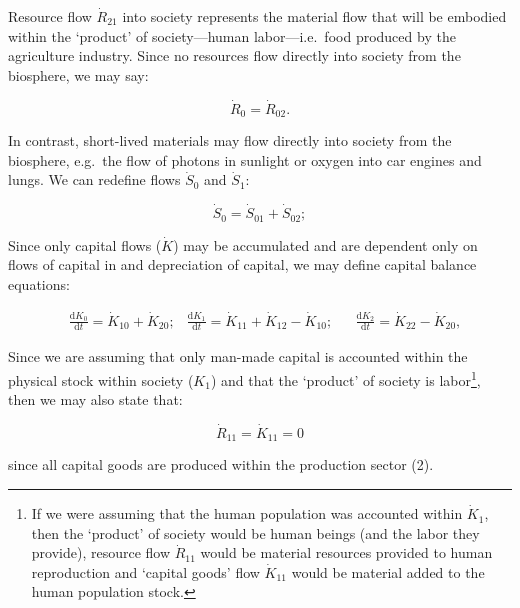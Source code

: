 Resource flow $\dot{R}_{21}$ into society represents the material flow that will be embodied
within the `product' of society---human labor---i.e.~food produced by the agriculture
industry. %
Since no resources flow directly into society from the biosphere, we may say:

\begin{equation}\label{eq:B_R0}
	\dot{R}_{0} = \dot{R}_{02}.
\end{equation}

In contrast, short-lived materials may flow directly into society from the biosphere, 
e.g.\ the flow of photons in sunlight or oxygen into car engines and lungs. 
We can redefine flows $\dot{S}_{0}$ and $\dot{S}_{1}$:

\begin{equation}\label{eq:B_S_def}
	\dot{S}_{0} 
	= \dot{S}_{01} + \dot{S}_{02};
\end{equation}

Since only capital flows ($\dot{K}$) may be accumulated and are dependent only on flows of 
capital in and depreciation of capital, we may define capital balance equations:

\begin{align}\label{eq:B_K_def}
	& \frac{\mathrm{d}K_{0}}{\mathrm{d}t}
	= \dot{K}_{10}
	+ \dot{K}_{20};
	& \frac{\mathrm{d}K_{1}}{\mathrm{d}t}
 	= \dot{K}_{11}
	+ \dot{K}_{12}
	- \dot{K}_{10};							&
	& \frac{\mathrm{d}K_{2}}{\mathrm{d}t} =
	\dot{K}_{22} 
	- \dot{K}_{20},
\end{align}

Since we are assuming that only man-made capital
is accounted within the physical stock within society ($K_{1}$)
and that the `product' of society is labor\footnote{If
we were assuming that the human population
was accounted within $\dot{K}_{1}$,
then the `product' of society would be human beings
(and the labor they provide),
resource flow $\dot{R}_{11}$ would be material resources
provided to human reproduction and
`capital goods' flow $\dot{K}_{11}$ would be material
added to the human population stock.},
then we may also state that:

\begin{equation}\label{eq:B_R11_K11}
	\dot{R}_{11} = \dot{K}_{11} = 0
\end{equation}

\noindent{}since all capital goods are produced within
the production sector (2).

